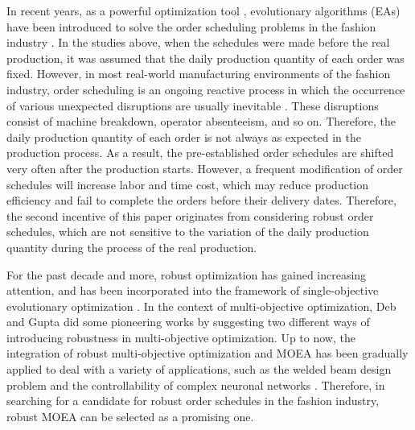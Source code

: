 \documentclass[journal]{IEEEtran}
\theoremstyle{definition}
\begin{document}
In recent years, as a powerful optimization tool \cite{eiben2015evolutionary,du2017differential}, evolutionary algorithms (EAs) have been introduced to solve the order scheduling problems in the fashion industry \cite{wong2014intelligent,guo2013hybrid}. In the studies above, when the schedules were made before the real production, it was assumed that the daily production quantity of each order was fixed. However, in most real-world manufacturing environments of the fashion industry, order scheduling is an ongoing reactive process in which the occurrence of various unexpected disruptions are usually inevitable \cite{ouelhadj2009survey}. These disruptions consist of machine breakdown, operator absenteeism, and so on. Therefore, the daily production quantity of each order is not always as expected in the production process. As a result, the pre-established order schedules are shifted very often after the production starts. However, a frequent modification of order schedules will increase labor and time cost, which may reduce production efficiency and fail to complete the orders before their delivery dates. Therefore, the second incentive of this paper originates from considering robust order schedules, which are not sensitive to the variation of the daily production quantity during the process of the real production.

For the past decade and more, robust optimization has gained increasing attention, and has been incorporated into the framework of single-objective evolutionary optimization \cite{jin2003trade,jin2005evolutionary}. In the context of multi-objective optimization, Deb and Gupta \cite{deb2006introducing} did some pioneering works by suggesting two different ways of introducing robustness in multi-objective optimization. Up to now, the integration of robust multi-objective optimization and MOEA has been gradually applied to deal with a variety of applications, such as the welded beam design problem \cite{deb2006introducing} and the controllability of complex neuronal networks \cite{tang2015robust}. Therefore, in searching for a candidate for robust order schedules in the fashion industry, robust MOEA can be selected as a promising one.
\end{document}
